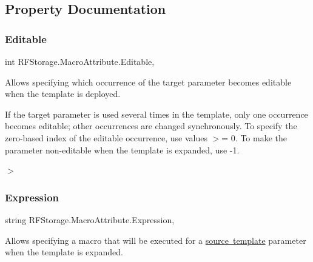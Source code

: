 \subsection{Property Documentation}
\mbox{\label{class_r_f_storage_1_1_macro_attribute_a2d233fa663b08429c167e4309725d4b8}} 
\subsubsection{\texorpdfstring{Editable}{Editable}}
{\footnotesize\ttfamily int R\+F\+Storage.\+Macro\+Attribute.\+Editable\hspace{0.3cm}{\ttfamily [get]}, {\ttfamily [set]}}



Allows specifying which occurrence of the target parameter becomes editable when the template is deployed. 

If the target parameter is used several times in the template, only one occurrence becomes editable; other occurrences are changed synchronously. To specify the zero-\/based index of the editable occurrence, use values $>$= 0. To make the parameter non-\/editable when the template is expanded, use -\/1. 

$>$ \mbox{\label{class_r_f_storage_1_1_macro_attribute_ad83d620afa226d505e41e9ba1ee94289}} 
\subsubsection{\texorpdfstring{Expression}{Expression}}
{\footnotesize\ttfamily string R\+F\+Storage.\+Macro\+Attribute.\+Expression\hspace{0.3cm}{\ttfamily [get]}, {\ttfamily [set]}}



Allows specifying a macro that will be executed for a \mbox{\hyperlink{class_r_f_storage_1_1_source_template_attribute}{source template}} parameter when the template is expanded. 

\mbox{\label{class_r_f_storage_1_1_macro_attribute_a78ff3b444cf65ac2e858be45a8de9a02}} 
